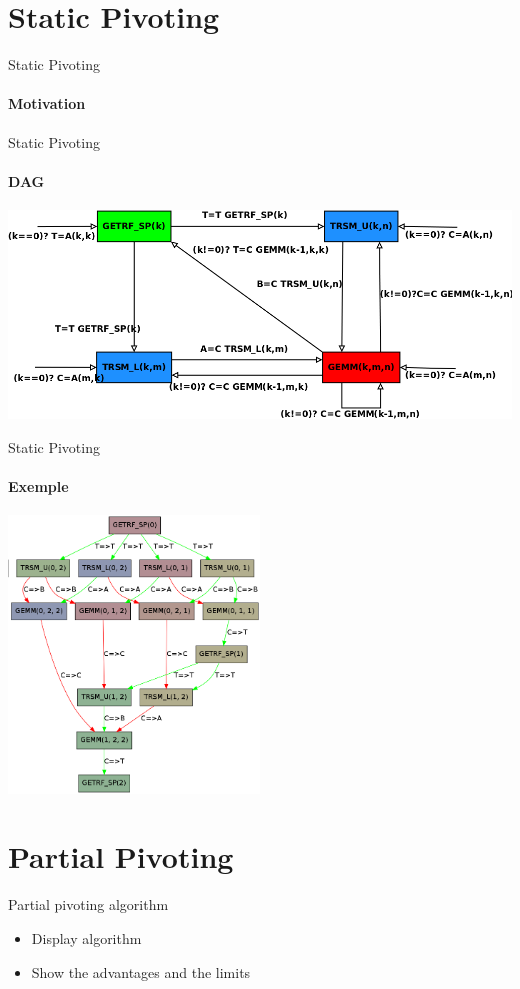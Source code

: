 \documentclass{beamer}
\begin{document}
\section{Static Pivoting}

\begin{frame}{Static Pivoting}
\framesubtitle{Motivation}
\end{frame}

\begin{frame}{Static Pivoting}
\framesubtitle{DAG}
\begin{center}
\includegraphics[width=\textwidth]{dag_getrf_sp.png} 
\end{center}
\end{frame}

\begin{frame}{Static Pivoting}
\framesubtitle{Exemple}
\begin{center}
\includegraphics[width=0.5\textwidth]{dag.png} 
\end{center}
\end{frame}

\section{Partial Pivoting}

\begin{frame}{Partial pivoting algorithm}
\begin{itemize}
\item Display algorithm
\item Show the advantages and the limits
\end{itemize}
\end{frame}
\end{document}
